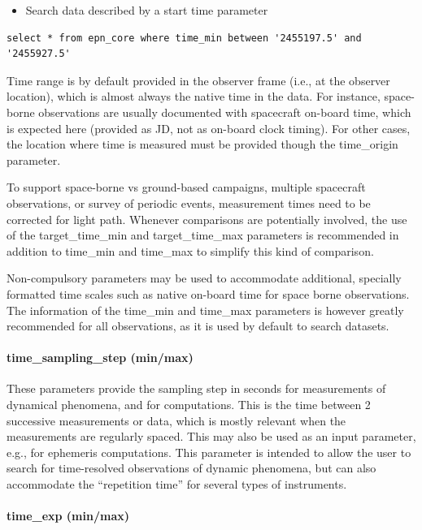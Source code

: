 \documentclass[11pt,a4paper]{ivoa}
\begin{document}
\begin{itemize}
\item Search data described by a start time parameter
\end{itemize}

\begin{verbatim}
select * from epn_core where time_min between '2455197.5' and '2455927.5'
\end{verbatim}

Time range is by default provided in the observer frame (i.e., at the observer location), which is almost always the native time in the data. For instance, space-borne observations are usually documented with spacecraft on-board time, which is expected here (provided as JD, not as on-board clock timing). For other cases, the location where time is measured must be provided though the time\_origin parameter.

To support space-borne vs ground-based campaigns, multiple spacecraft observations, or survey of periodic events, measurement times need to be corrected for light path. Whenever comparisons are potentially involved, the use of the target\_time\_min and target\_time\_max parameters is recommended in addition to time\_min and time\_max to simplify this kind of comparison.

Non-compulsory parameters may be used to accommodate additional, specially formatted time scales such as native on-board time for space borne observations. The information of the time\_min and time\_max parameters is however greatly recommended for all observations, as it is used by default to search datasets.

\paragraph{time\_sampling\_step (min/max)}

These parameters provide the sampling step in seconds for measurements of dynamical phenomena, and for computations. This is the time between 2 successive measurements or data, which is mostly relevant when the measurements are regularly spaced. This may also be used as an input parameter, e.g., for ephemeris computations. This parameter is intended to allow the user to search for time-resolved observations of dynamic phenomena, but can also accommodate the ``repetition time'' for several types of instruments.

\paragraph{time\_exp (min/max)}
\end{document}

